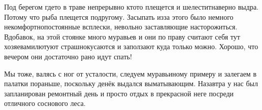Под берегом где\sdash то в траве непрерывно кто\sdash то плещется и шелестит\mdash наверно выдра. Потому что рыба плещется по\sdash другому. Засыпать из\sdash за этого было немного некомфортно\mdash постоянные всплески, невольно заставляющие насторожиться. Вдобавок, на этой стоянке много муравьев и они по праву считают себя тут хозяевами\mdash лютуют страшно\mdash кусаются и заползают куда только можно. Хорошо, что вечером они достаточно рано идут спать!

Мы тоже, валясь с ног от усталости, следуем муравьиному примеру и залегаем в палатки пораньше, поскольку денёк выдался выматывающим. Назавтра у нас был запланирован ремонтный день и просто отдых в прекрасной неге посреди отличного соснового леса.

\begin{center}
\end{center}
